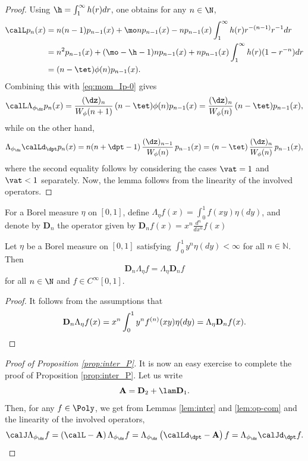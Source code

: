 \begin{proof}
Using $\h = \int_1^\infty h(r)dr$, one obtains for any $n\in \N$,
\begin{align*}
\calL p_n(x) &= n(n-1)p_{n-1}(x)+ \mo n p_{n-1}(x)-np_{n-1}(x)\int_1^\infty h(r) r^{-(n-1)} r^{-1}dr \nonumber \\
&= n^2 p_{n-1}(x) + (\mo-\h-1)np_{n-1}(x)+np_{n-1}(x)\int_1^\infty h(r) (1-r^{-n}) dr \nonumber \\
&= (n-\tet)\phi(n)p_{n-1}(x).
\end{align*}
Combining this with \eqref{eq:mom_Ip-0} gives
\begin{equation*}
\calL \Lambda_{\phi_{\dz}}p_n(x) = \frac{(\dz)_n}{W_{\phi}(n+1)}\, (n-\tet)\phi(n) p_{n-1}(x) = \frac{(\dz)_n}{W_{\phi}(n)}\, (n-\tet)p_{n-1}(x),
\end{equation*}
while on the other hand,
\begin{align*}
\Lambda_{\phi_{\dz}} \calLd_{\dpt} p_n(x) = n(n+\dpt-1)\,\frac{(\dz)_{n-1}}{W_{\phi}(n)}\, p_{n-1}(x) = (n-\tet)\,\frac{(\dz)_n}{W_{\phi}(n)}\,p_{n-1}(x),
\end{align*}
where the second equality follows by considering the cases $\vat=1$ and $\vat < 1$ separately. Now, the lemma
follows from the linearity of the involved operators.
\end{proof}

For a Borel measure $\eta$ on $[0,1]$, define $\Lambda_{\eta}f(x)=\int_{0}^{1}f(xy)\eta(dy)$, and denote by $\mathbf{D}_n$ the operator given by $\mathbf{D}_n f(x) = x^n \frac{d^n}{dx^n} f(x)$

\begin{lemma} \label{lem:op-com}
Let $\eta$ be a Borel measure on $[0,1]$ satisfying
$\int_{0}^{1}y^n \eta(dy)<\infty$ for all $n \in \mathbb{N}$.
Then
\begin{equation*}
\mathbf{D}_{n} \Lambda_{\eta} f = \Lambda_{\eta} \mathbf{D}_{n} f
\end{equation*}
for all $n\in \N$ and $f \in C^\infty[0,1]$.
\end{lemma}

\begin{proof}
It follows from the assumptions that
\[
\mathbf{D}_{n} \Lambda_{\eta} f(x) = x^n \int_0^1 y^n f^{(n)}(xy) \eta (dy) = \Lambda_{\eta} \mathbf{D}_{n} f(x).\qedhere
\]
\end{proof}

\begin{proof}[Proof of Proposition \ref{prop:inter_P}]
It is now an easy exercise to complete the proof of Proposition \ref{prop:inter_P}. Let us write
\begin{equation*}
\mathbf{A}= \mathbf{D}_{2}+ \lam \mathbf{D}_{1}.
\end{equation*}
Then, for any $f \in \Poly$, we get from Lemmas \ref{lem:inter} and \ref{lem:op-com}
and the linearity of the involved operators,
\begin{equation*}
\calJ \Lambda_{\phi_{\dz}} f = \left( \calL -\mathbf{A}\right) \Lambda_{\phi_{\dz}}f = \Lambda_{\phi_{\dz}}\left( \calLd_{\dpt} -\mathbf{A}\right) f
= \Lambda_{\phi_{\dz}} \calJd_{\dpt} f.\qedhere
\end{equation*}
\end{proof}

